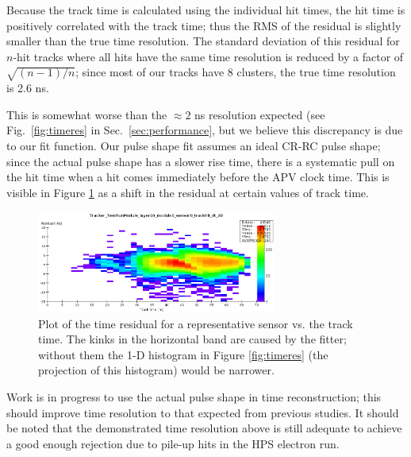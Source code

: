 Because the track time is calculated using the individual hit times, the hit time is positively correlated 
with the track time; thus the RMS of the residual is slightly smaller than the true time resolution.
The standard deviation of this residual for $n$-hit tracks where all hits have the same time resolution 
is reduced by a factor of $\sqrt{(n-1)/n}$; since most of our tracks have 8 clusters, the true time 
resolution is 2.6 ns. 

This is somewhat worse than the $\approx 2$ ns resolution expected (see Fig.~\ref{fig:timeres} in 
Sec.~\ref{sec:performance}, but we believe this discrepancy is due to our fit function. Our pulse 
shape fit assumes an ideal CR-RC pulse shape; since the actual pulse shape has a slower rise time, 
there is a systematic pull on the hit time when a hit comes immediately before the APV clock time. 
This is visible in Figure \ref{fig:timeres_2D} as a shift in the residual at certain values of track time.
\begin{figure}[]
	\includegraphics[width=0.7\textwidth]{test2012/svtperformance/timeres_2D}
	\caption{\small{Plot of the time residual for a representative sensor vs. the track time. 
		The kinks in the horizontal band are caused by the fitter; without them the 1-D histogram in Figure \ref{fig:timeres} (the projection of this histogram) would be narrower.} }
	\label{fig:timeres_2D}
\end{figure}
Work is in progress to use the actual pulse shape in time reconstruction; this should improve time resolution to that expected from previous studies. 
It should be noted that the demonstrated time resolution above is still adequate to achieve a good 
enough rejection due to pile-up hits in the HPS electron run. 




